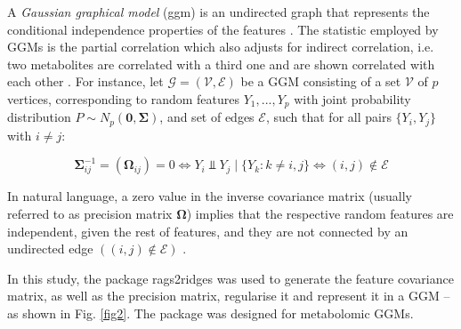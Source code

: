 \documentclass{amsart}
\begin{document}
A \textit{Gaussian graphical model} (\acrshort{ggm}) is an undirected graph that represents the conditional independence properties of the features \cite{KollerProbabilisticTechniques}. The statistic employed by GGMs is the partial correlation which also adjusts for indirect correlation, i.e. two metabolites are correlated with a third one and are shown correlated with each other \cite{Amara2022NetworksInterpretation}. For instance, let $\mathcal{G=(V,E)}$ be a GGM consisting of a set $\mathcal{V}$ of $p$ vertices, corresponding to random features $Y_1,...,Y_p$ with joint probability distribution $P \sim N_p(\mathbf{0, \Sigma})$, and set of edges $\mathcal{E}$, such that for all pairs $\{Y_i , Y_j\}$ with $i\neq j$:

\[ \mathbf{\Sigma}_{ij}^{-1} = (\mathbf{\Omega}_{ij})=0 \Longleftrightarrow Y_i \Perp Y_j\mid\{Y_k : k \neq i,j\} \Longleftrightarrow (i, j) \notin \mathcal{E} \]

In natural language, a zero value in the inverse covariance matrix (usually referred to as precision matrix $\mathbf{\Omega}$) implies that the respective random features are independent, given the rest of features, and they are not connected by an undirected edge $((i, j) \notin \mathcal{E})$ \cite{Peeters2022Rags2ridges:Matrices}.

In this study, the package \textsf{rags2ridges} \cite{Peeters2022Rags2ridges:Matrices} was used to generate the feature covariance matrix, as well as the precision matrix, regularise it and represent it in a GGM --as shown in Fig. \ref{fig2}. The package was designed for metabolomic GGMs.
\end{document}
